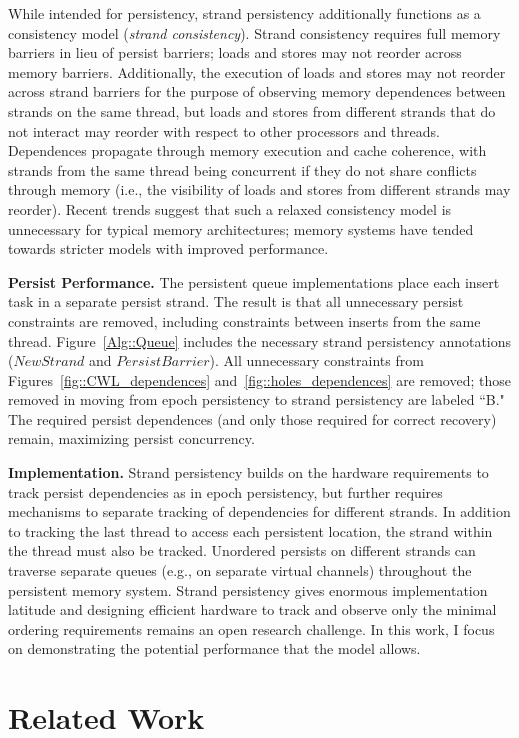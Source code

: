 While intended for persistency, strand persistency additionally functions as a consistency model (\emph{strand consistency}).
Strand consistency requires full memory barriers in lieu of persist barriers; loads and stores may not reorder across memory barriers.
Additionally, the execution of loads and stores may not reorder across strand barriers for the purpose of observing memory dependences between strands on the same thread, but loads and stores from different strands that do not interact may reorder with respect to other processors and threads.
Dependences propagate through memory execution and cache coherence, with strands from the same thread being concurrent if they do not share conflicts through memory (i.e., the visibility of loads and stores from different strands may reorder).
Recent trends suggest that such a relaxed consistency model is unnecessary for typical memory architectures; memory systems have tended towards stricter models with improved performance.

\textbf{Persist Performance.}
The persistent queue implementations place each insert task in a separate persist strand.
The result is that all unnecessary persist constraints are removed, including constraints between inserts from the same thread.
Figure~\ref{Alg::Queue} includes the necessary strand persistency annotations ($NewStrand$ and $PersistBarrier$).
All unnecessary constraints from Figures~\ref{fig::CWL_dependences} and~\ref{fig::holes_dependences} are removed; those removed in moving from epoch persistency to strand persistency are labeled ``B."
The required persist dependences (and only those required for correct recovery) remain, maximizing persist concurrency.

\textbf{Implementation.}
Strand persistency builds on the hardware requirements to track persist dependencies as in epoch persistency, but further requires mechanisms to separate tracking of dependencies for different strands.
In addition to tracking the last thread to access each persistent location, the strand within the thread must also be tracked.
Unordered persists on different strands can traverse separate queues (e.g., on separate virtual channels) throughout the persistent memory system.
Strand persistency gives enormous implementation latitude and designing efficient hardware to track and observe only the minimal ordering requirements remains an open research challenge.
In this work, I focus on demonstrating the potential performance that the model allows.

\section{Related Work}
\label{sec:PersistencyModels:RelatedWork}

